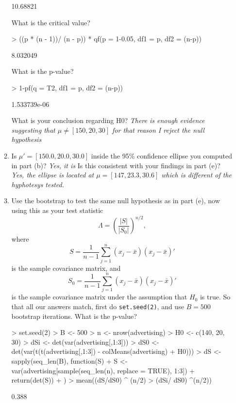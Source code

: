 \documentclass[12pt,a4paper]{paper}
\begin{document}
\begin{enumerate}
\begin{enumerate}
\begin{Schunk}
\begin{Soutput}
         [,1]
[1,] 10.68821
\end{Soutput}
\end{Schunk}
What is the critical value?
\begin{Schunk}
\begin{Sinput}
> ((p * (n - 1))/ (n - p)) * qf(p = 1-0.05, df1 = p, df2 = (n-p))
\end{Sinput}
\begin{Soutput}
[1] 8.032049
\end{Soutput}
\end{Schunk}
What is the p-value? 
\begin{Schunk}
\begin{Sinput}
> 1-pf(q = T2, df1 = p, df2 = (n-p))
\end{Sinput}
\begin{Soutput}
             [,1]
[1,] 1.533739e-06
\end{Soutput}
\end{Schunk}
What is your conclusion regarding H0?
\emph{There is enough evidence suggesting that $\mu \neq \left[150, 20, 30\right]$ for that reason I reject the null hypothesis}
\item Is $\mu' = [150.0, 20.0, 30.0]$ inside the 95\% confidence ellipse you computed in part (b)? \emph{Yes, it is}  Is this consistent with your findings in part (e)? \emph{Yes, the ellipse is located at $\mu = \left[147, 23.3, 30.6\right]$ which is different of the hyphotesys tested.}
\item Use the bootstrap to test the same null hypothesis as in part (e), now using this as your test statistic
\[\Lambda = \left(\frac{\left|S\right|}{\left|S_{0}\right|}\right)^{n/2},\]where \[S = \frac{1}{n-1}\sum_{j=1}^{n}(x_{j}-\bar{x})(x_{j}-\bar{x})'\] is the sample covariance matrix, and \[S_{0} = \frac{1}{n-1}\sum_{j=1}^{n}(x_{j}-\bar{x})(x_{j}-\bar{x})'\] is the sample covariance matrix under the assumption that $H_{0}$ is true. So that all our answers match, first do \texttt{set.seed(2)}, and use $B=500$ bootstrap iterations. What is the p-value?
\begin{Schunk}
\begin{Sinput}
> set.seed(2)
> B <- 500
> n <- nrow(advertising)
> H0 <- c(140, 20, 30)
> dSi <- det(var(advertising[,1:3]))
> dS0 <- det(var(t(t(advertising[,1:3]) - colMeans(advertising) + H0)))
> dS <- sapply(seq_len(B), function(S){
+   S <- var(advertising[sample(seq_len(n), replace = TRUE), 1:3])
+   return(det(S))
+ })
> mean((dS/dS0) ^ (n/2) >  (dSi/ dS0) ^(n/2))
\end{Sinput}
\begin{Soutput}
[1] 0.388
\end{Soutput}
\end{Schunk}
\end{enumerate}
\end{enumerate}
\end{document}
